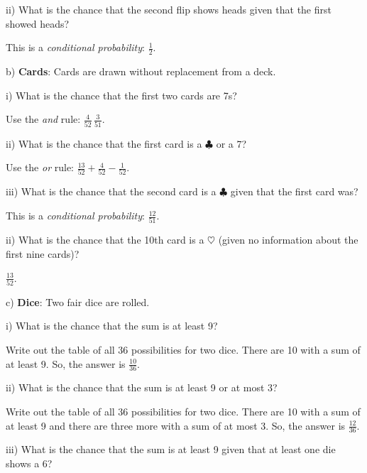 \documentclass[10pt]{article}
\begin{document}
\hspace{20pt} ii) What is the chance that the second flip shows heads given that the first showed heads?

{\color{blue} This is a \textit{conditional probability}: $\frac{1}{2}$.}
\bigskip

\hspace{10pt} b) \textbf{Cards}:  Cards are drawn without replacement from a deck.

\hspace{20pt} i) What is the chance that the first two cards are 7s?

{\color{blue} Use the  \textit{and} rule: $\frac{4}{52}\,\frac{3}{51}$.}
\bigskip

\hspace{20pt} ii) What is the chance that the first card is a $\clubsuit$ or a 7?

{\color{blue} Use the  \textit{or} rule: $\frac{13}{52} + \frac{4}{52} - \frac{1}{52}$.}
\bigskip

\hspace{20pt} iii) What is the chance that the second card is a $\clubsuit$ given that the first card was?

{\color{blue} This is a   \textit{conditional probability}: $\frac{12}{51}$.}
\bigskip

\hspace{20pt} ii) What is the chance that the 10th card is a $\heartsuit$ (given no information about 
  the first nine cards)?

{\color{blue} $\frac{13}{52}$.}
\bigskip

\hspace{10pt} c) \textbf{Dice}: Two fair dice are rolled.

\hspace{20pt} i) What is the chance that the sum is at least 9?

{\color{blue} Write out the table of all 36 possibilities for two dice.  There are 10 with a sum of at least
9. So, the answer is $\frac{10}{36}$.}
\bigskip

\hspace{20pt} ii) What is the chance that the sum is at least 9 or at most 3?

{\color{blue} Write out the table of all 36 possibilities for two dice.  There are 10 with a sum of at least
9 and there are three more with a sum of at most 3. So, the answer is $\frac{12}{36}$.}
\bigskip

\hspace{20pt} iii) What is the chance that the sum is at least 9 given that at least one die shows a 6?
\end{document}
